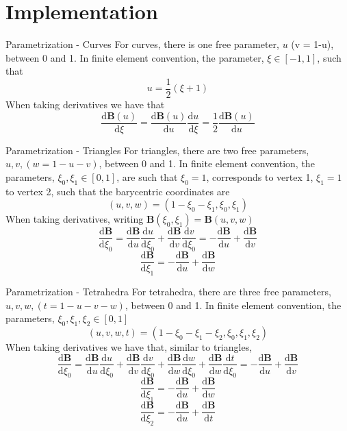 \documentclass[12pt]{beamer}
\begin{document}
\section{Implementation}
\begin{frame}{Parametrization - Curves}
For curves, there is one free parameter, $u$ (v = 1-u), between 0 and 1. In finite element convention, the parameter, $\xi \in [-1,1]$, such that
\[ u = \frac{1}{2}(\xi+1)\]
When taking derivatives we have that
\[ \frac{\mathrm{d} \mathbf{B}(u)}{\mathrm{d} \xi}  =  \frac{\mathrm{d} \mathbf{B}(u)}{\mathrm{d} u}\frac{\mathrm{d} u}{\mathrm{d} \xi} = \frac{1}{2}\frac{\mathrm{d} \mathbf{B}(u)}{\mathrm{d} u}
\]

\end{frame}
\begin{frame}{Parametrization - Triangles}
For triangles, there are two free parameters, $u,v,(w = 1-u-v)$, between 0 and 1. In finite element convention, the parameters, $\xi_0,\xi_1 \in [0,1]$, are such that 
$\xi_0 = 1$, corresponds to vertex 1, $\xi_1 = 1$ to vertex 2, such that the barycentric coordinates are
\[(u,v,w) = (1-\xi_0-\xi_1,\xi_0,\xi_1)\]
When taking derivatives, writing $\mathbf{B}(\xi_0,\xi_1) = \mathbf{B}(u,v,w)$
{
  \footnotesize
\[ \frac{\mathrm{d} \mathbf{B}}{\mathrm{d} \xi_0}  =  \frac{\mathrm{d} \mathbf{B}}{\mathrm{d} u}\frac{\mathrm{d} u}{\mathrm{d} \xi_0} + \frac{\mathrm{d} \mathbf{B}}{\mathrm{d} v}\frac{\mathrm{d} v}{\mathrm{d} \xi_0} = -\frac{\mathrm{d} \mathbf{B}}{\mathrm{d} u}+\frac{\mathrm{d} \mathbf{B}}{\mathrm{d} v}
\]
\[ \frac{\mathrm{d} \mathbf{B}}{\mathrm{d} \xi_1} = -\frac{\mathrm{d} \mathbf{B}}{\mathrm{d} u}+\frac{\mathrm{d} \mathbf{B}}{\mathrm{d} w}
\]
}
\end{frame}
\begin{frame}{Parametrization - Tetrahedra}
For tetrahedra, there are three free parameters, $u,v,w,(t = 1-u-v-w)$, between 0 and 1. In finite element convention, the parameters, $\xi_0,\xi_1,\xi_2 \in [0,1]$
\[(u,v,w,t) = (1-\xi_0-\xi_1-\xi_2,\xi_0,\xi_1,\xi_2)\]
When taking derivatives we have that, similar to triangles,
{
  \footnotesize
\[ \frac{\mathrm{d} \mathbf{B}}{\mathrm{d} \xi_0}  =  \frac{\mathrm{d} \mathbf{B}}{\mathrm{d} u}\frac{\mathrm{d} u}{\mathrm{d} \xi_0} + \frac{\mathrm{d} \mathbf{B}}{\mathrm{d} v}\frac{\mathrm{d} v}{\mathrm{d} \xi_0} + \frac{\mathrm{d} \mathbf{B}}{\mathrm{d} w}\frac{\mathrm{d} w}{\mathrm{d} \xi_0}+ \frac{\mathrm{d} \mathbf{B}}{\mathrm{d} w}\frac{\mathrm{d} t}{\mathrm{d} \xi_0} = -\frac{\mathrm{d} \mathbf{B}}{\mathrm{d} u}+\frac{\mathrm{d} \mathbf{B}}{\mathrm{d} v}
\]
\[ \frac{\mathrm{d} \mathbf{B}}{\mathrm{d} \xi_1} = -\frac{\mathrm{d} \mathbf{B}}{\mathrm{d} u}+\frac{\mathrm{d} \mathbf{B}}{\mathrm{d} w} 
\]
\[ \frac{\mathrm{d} \mathbf{B}}{\mathrm{d} \xi_2} = -\frac{\mathrm{d} \mathbf{B}}{\mathrm{d} u}+\frac{\mathrm{d} \mathbf{B}}{\mathrm{d} t}
\]
}
\end{frame}
\end{document}
